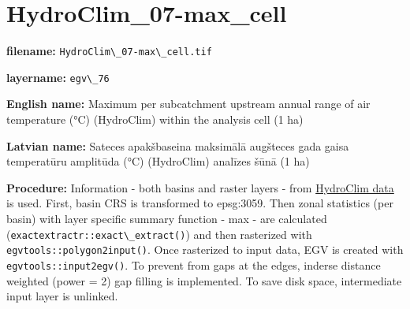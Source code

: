 \documentclass[
]{book}
\newcommand{\passthrough}[1]{#1}
\begin{document}
\section{HydroClim\_07-max\_cell}\label{ch06.076}

\textbf{filename:} \passthrough{\lstinline!HydroClim\_07-max\_cell.tif!}

\textbf{layername:} \passthrough{\lstinline!egv\_76!}

\textbf{English name:} Maximum per subcatchment upstream annual range of air temperature (°C) (HydroClim) within the analysis cell (1 ha)

\textbf{Latvian name:} Sateces apakšbaseina maksimālā augšteces gada gaisa temperatūru amplitūda (°C) (HydroClim) analīzes šūnā (1 ha)

\textbf{Procedure:} Information - both basins and raster layers - from \hyperref[Ch04.12]{HydroClim data}
is used. First, basin CRS is transformed to epsg:3059. Then zonal statistics (per basin) with
layer specific summary function - max - are calculated (\passthrough{\lstinline!exactextractr::exact\_extract()!})
and then rasterized with \passthrough{\lstinline!egvtools::polygon2input()!}. Once rasterized to input data,
EGV is created with \passthrough{\lstinline!egvtools::input2egv()!}. To prevent from gaps at the edges,
inderse distance weighted (power = 2) gap filling is implemented. To save disk space,
intermediate input layer is unlinked.
\end{document}
